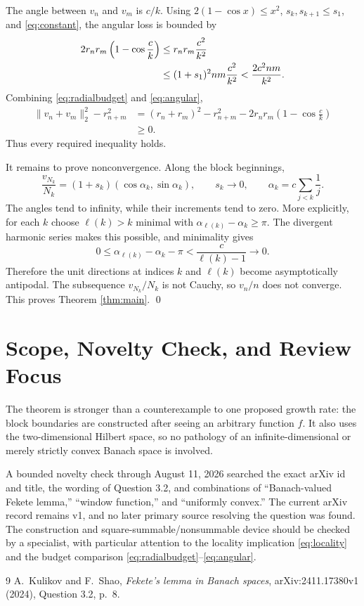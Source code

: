 \documentclass[11pt]{article}
\newcommand{\uu}[1]{(\cos #1,\sin #1)}
\begin{document}
The angle between \(v_n\) and \(v_m\) is \(c/k\).  Using
\(2(1-\cos x)\leq x^2\), \(s_k,s_{k+1}\leq s_1\), and
\eqref{eq:constant}, the angular loss is bounded by
\begin{align}
 2r_nr_m\left(1-\cos\frac ck\right)
 &\leq r_nr_m\frac{c^2}{k^2}\notag\\
 &\leq (1+s_1)^2nm\frac{c^2}{k^2}
 <\frac{2c^2nm}{k^2}.
 \label{eq:angular}
\end{align}
Combining \eqref{eq:radialbudget} and \eqref{eq:angular},
\begin{align*}
 \|v_n+v_m\|_2^2-r_{n+m}^2
 &=(r_n+r_m)^2-r_{n+m}^2
   -2r_nr_m\left(1-\cos\frac ck\right)\\
 &\geq0.
\end{align*}
Thus every required inequality holds.

It remains to prove nonconvergence.  Along the block beginnings,
\[
 \frac{v_{N_k}}{N_k}=(1+s_k)\uu{\alpha_k},
 \qquad s_k\longrightarrow0,
 \qquad \alpha_k=c\sum_{j<k}\frac1j.
\]
The angles tend to infinity, while their increments tend to zero.  More
explicitly, for each \(k\) choose \(\ell(k)>k\) minimal with
\(\alpha_{\ell(k)}-\alpha_k\geq\pi\).  The divergent harmonic series makes
this possible, and minimality gives
\[
 0\leq\alpha_{\ell(k)}-\alpha_k-\pi
 <\frac{c}{\ell(k)-1}\longrightarrow0.
\]
Therefore the unit directions at indices \(k\) and \(\ell(k)\) become
asymptotically antipodal.  The subsequence \(v_{N_k}/N_k\) is not Cauchy, so
\(v_n/n\) does not converge.  This proves Theorem \ref{thm:main}. \qed

\section*{Scope, Novelty Check, and Review Focus}

The theorem is stronger than a counterexample to one proposed growth rate:
the block boundaries are constructed after seeing an arbitrary function
\(f\).  It also uses the two-dimensional Hilbert space, so no pathology of an
infinite-dimensional or merely strictly convex Banach space is involved.

A bounded novelty check through August 11, 2026 searched the exact arXiv id
and title, the wording of Question 3.2, and combinations of ``Banach-valued
Fekete lemma,'' ``window function,'' and ``uniformly convex.''  The current
arXiv record remains v1, and no later primary source resolving the question
was found.  The construction and square-summable/nonsummable device should be
checked by a specialist, with particular attention to the locality implication
\eqref{eq:locality} and the budget comparison
\eqref{eq:radialbudget}--\eqref{eq:angular}.

\begin{thebibliography}{9}
A.~Kulikov and F.~Shao,
\emph{Fekete's lemma in Banach spaces}, arXiv:2411.17380v1 (2024),
Question 3.2, p.~8.
\end{thebibliography}
\end{document}

